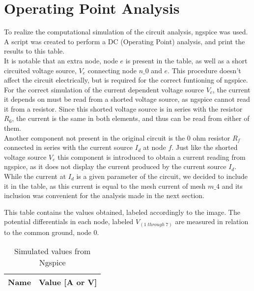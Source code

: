 \section{Operating Point Analysis}
\label{sec:simulation}

To realize the computational simulation of the circuit analysis, ngspice was used. A script was created to perform a DC (Operating Point) analysis, and print the results to this table.\\
It is notable that an extra node, node $e$ is present in the table, as well as a short circuited voltage source, $V_{e}$ connecting node $n\_0$ and $e$. This procedure doesn't affect the circuit electrically, but is required for the correct funtioning of ngspice. For the correct simulation of the current dependent voltage source $V_{c}$, the current it depends on must be read from a shorted voltage source, as ngspice cannot read it from a resistor. Since this shorted voltage source is in series with the resistor $R_{6}$, the current is the same in both elements, and thus can be read from either of them.\\
Another component not present in the original circuit is the 0 ohm resistor $R_{f}$ connected in series with the current source $I_{d}$ at node $f$. Just like the shorted voltage source $V_{e}$ this component is introduced to obtain a current reading from ngspice, as it does not display the current produced by the current source $I_{d}$. While the current at $I_{d}$ is a given parameter of the circuit, we decided to include it in the table, as this current is equal to the mesh current of mesh $m\_4$ and its inclusion was convenient for the analysis made in the next section.

This table contains the values obtained, labeled accordingly to the image. The potential differentials in each node, labeled $V_{(1 \; through \; 7)}$ are measured in relation to the common ground, node 0. 

\begin{table}[h]
  \centering
  \begin{tabular}{|l|r|}
    \hline    
    {\bf Name} & {\bf Value [A or V]} \\ \hline
    
  \end{tabular}
  \caption{Simulated values from Ngspice}
  \label{tab:op}
\end{table}



